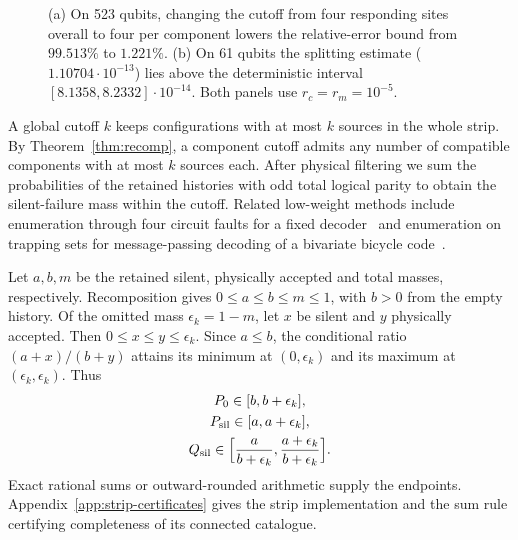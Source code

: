 \documentclass[10pt,twocolumn]{article}
\theoremstyle{definition}
\begin{document}
\begin{figure}[!htb]
\caption{(a) On 523 qubits, changing the cutoff from four responding
sites overall to four per component lowers the relative-error bound
from $99.513\%$ to $1.221\%$. (b) On 61 qubits the splitting estimate
($1.10704\cdot10^{-13}$) lies above the deterministic interval
$[8.1358,8.2332]\cdot10^{-14}$. Both panels use $r_c=r_m=10^{-5}$.}
\label{fig:strip-comparison}
\end{figure}

A global cutoff $k$ keeps configurations with at most $k$ sources in
the whole strip. By Theorem~\ref{thm:recomp}, a component cutoff admits
any number of compatible components with at most $k$ sources each.
After physical filtering we sum the probabilities of the retained
histories with odd total logical parity to obtain the silent-failure
mass within the cutoff. Related low-weight methods include enumeration through
four circuit faults for a fixed decoder~\cite[App.~E.3]{Zheng26}
and enumeration on trapping sets for message-passing decoding of a
bivariate bicycle code~\cite[Secs.~III.3 and~V]{PRV26}.

Let $a,b,m$ be the retained silent, physically accepted and total
masses, respectively. Recomposition gives $0\le a\le b\le m\le1$,
with $b>0$ from the empty history. Of the omitted mass $\epsilon_k=1-m$,
let $x$ be silent and $y$ physically accepted. Then
$0\le x\le y\le\epsilon_k$. Since $a\le b$, the conditional ratio
$(a+x)/(b+y)$ attains its minimum at $(0,\epsilon_k)$ and its
maximum at $(\epsilon_k,\epsilon_k)$. Thus
\begin{equation}\label{eq:path25-certificate}
\begin{gathered}
 P_0\in[b,b+\epsilon_k],\\
 P_{\rm sil}\in[a,a+\epsilon_k],\\
 Q_{\rm sil}\in\Bigl[\frac{a}{b+\epsilon_k},
                    \frac{a+\epsilon_k}{b+\epsilon_k}\Bigr].
\end{gathered}
\end{equation}
Exact rational sums or outward-rounded arithmetic supply the endpoints.
Appendix~\ref{app:strip-certificates} gives the strip implementation and
the sum rule certifying completeness of its connected catalogue.
\end{document}
